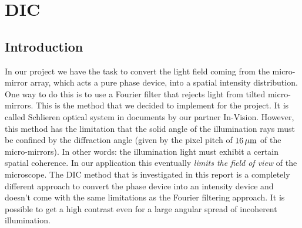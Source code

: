 \chapter{DIC}
\lstset{language=Maxima}

\citep{Schwertner2008}


\section{Introduction}
In our project we have the task to convert the light field coming from
the micro-mirror array, which acts a pure phase device, into a spatial
intensity distribution. One way to do this is to use a Fourier filter
that rejects light from tilted micro-mirrors. This is the method that
we decided to implement for the project. It is called Schlieren
optical system in documents by our partner In-Vision. However, this
method has the limitation that the solid angle of the illumination
rays must be confined by the diffraction angle (given by the pixel
pitch of $\unit[16]{\mu m}$ of the micro-mirrors). In other words: the
illumination light must exhibit a certain spatial coherence. In our
application this eventually \emph{limits the field of view} of the
microscope. The DIC method that is investigated in this report is a
completely different approach to convert the phase device into an
intensity device and doesn't come with the same limitations as the
Fourier filtering approach. It is possible to get a high contrast even
for a large angular spread of incoherent illumination.

